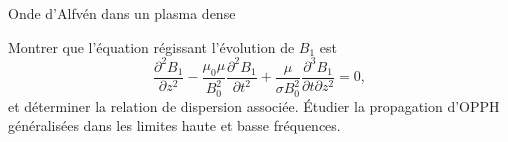 \begin{exo}[PC][3][colle]{Onde d'Alfvén dans un plasma dense}
\begin{quest}

           \item Montrer que l'équation régissant l'évolution de $B_1$ est 
           \begin{equation}
            \dfrac{\partial^2 B_1}{\partial z^2} - \dfrac{\mu_0 \mu}{B_0^2} \dfrac{\partial^2 B_1}{\partial t^2} + \dfrac{\mu}{\sigma B_0^2} \dfrac{ \partial^3 B_1}{\partial t \partial z^2}  = 0,
           \end{equation}
           et déterminer la relation de dispersion associée. Étudier la propagation d'OPPH généralisées dans les limites haute et basse fréquences.

           \sol{
           
           }


    \end{quest}
\end{exo}

